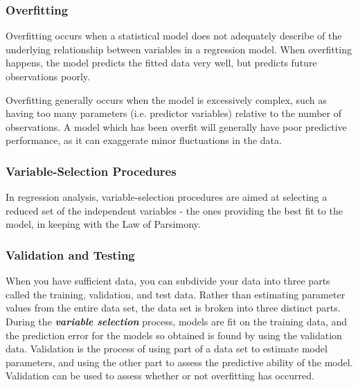 \begin{frame}
\frametitle{Overfitting}

Overfitting occurs when a statistical model does not adequately describe of the underlying relationship between variables in a regression model. When overfitting happens, the model predicts the fitted data very well, but predicts future observations poorly.

Overfitting generally occurs when the model is excessively complex, such as having too many parameters (i.e. predictor variables) relative to the number of observations. A model which has been overfit will generally have poor predictive performance, as it can exaggerate minor fluctuations in the data.

\end{frame}
\begin{frame}
\frametitle{Variable-Selection Procedures}

In regression analysis, variable-selection procedures are aimed at selecting a reduced set of the independent variables - the ones providing the best fit to the model, in keeping with the Law of Parsimony.
\end{frame}
\begin{frame}
\frametitle{Validation and Testing}
When you have sufficient data, you can subdivide your data into three parts called the training, validation, and test data. Rather than estimating parameter values from the entire data set, the data set is broken into three distinct parts. During the \textbf{\textit{variable selection}} process, models are fit on the training data, and the prediction error for the models so obtained is found by using the validation data. Validation is the process of using part of a data set to estimate model parameters, and using the other part to assess the predictive ability of the model. Validation can be used to assess whether or not overfitting has occurred.
\end{frame}
